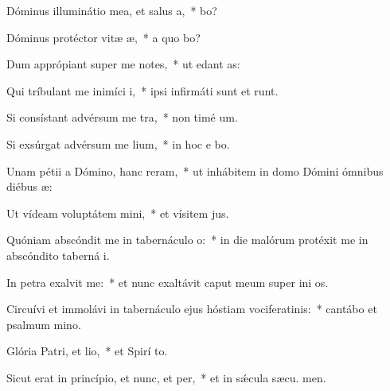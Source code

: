 \item Dóminus illuminátio mea, et salus a,~*  bo?
\item Dóminus protéctor vitæ æ,~* a quo bo?
\item Dum apprópiant super me notes,~* ut edant  as:
\item Qui tríbulant me inimíci i,~* ipsi infirmáti sunt et runt.
\item Si consístant advérsum me tra,~* non timé  um.
\item Si exsúrgat advérsum me lium,~* in hoc e bo.
\item Unam pétii a Dómino, hanc reram,~* ut inhábitem in domo Dómini ómnibus diébus  æ:
\item Ut vídeam voluptátem mini,~* et vísitem  jus.
\item Quóniam abscóndit me in tabernáculo o:~* in die malórum protéxit me in abscóndito taberná i.
\item In petra exalvit me:~* et nunc exaltávit caput meum super ini os.
\item Circuívi et immolávi in tabernáculo ejus hóstiam vociferatinis:~* cantábo et psalmum  mino.
\item Glória Patri, et lio,~* et Spirí to.
\item Sicut erat in princípio, et nunc, et per,~* et in sǽcula sæcu. men.
